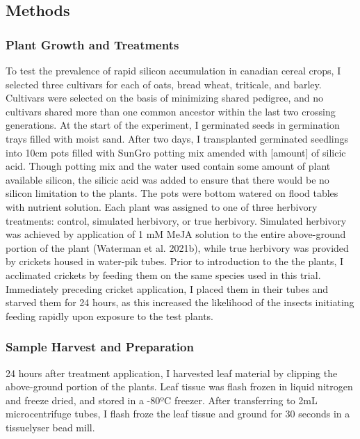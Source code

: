 \documentclass[12pt, letterpaper, ]{article}
\begin{document}
\subsection{Methods}

\subsubsection{Plant Growth and Treatments}

To test the prevalence of rapid silicon accumulation in canadian cereal crops, I selected three cultivars for each of oats, bread wheat, triticale, and barley. Cultivars were selected on the basis of minimizing shared pedigree, and no cultivars shared more than one common ancestor within the last two crossing generations. At the start of the experiment, I germinated seeds in germination trays filled with moist sand. After two days, I transplanted germinated seedlings into 10cm pots filled with SunGro potting mix amended with [amount] of silicic acid. Though potting mix and the water used contain some amount of plant available silicon, the silicic acid was added to ensure that there would be no silicon limitation to the plants. The pots were bottom watered on flood tables with nutrient solution. Each plant was assigned to one of three herbivory treatments: control, simulated herbivory, or true herbivory. Simulated herbivory was achieved by application of 1 mM MeJA solution to the entire above-ground portion of the plant (Waterman et al. 2021b), while true herbivory was provided by crickets housed in water-pik tubes. Prior to introduction to the the plants, I acclimated crickets by feeding them on the same species used in this trial. Immediately preceding cricket application, I placed them in their tubes and starved them for 24 hours, as this increased the likelihood of the insects initiating feeding rapidly upon exposure to the test plants. 

\subsubsection{Sample Harvest and Preparation}

24 hours after treatment application, I harvested leaf material by clipping the above-ground portion of the plants. Leaf tissue was flash frozen in liquid nitrogen and freeze dried, and stored in a -80ºC freezer. After transferring to 2mL microcentrifuge tubes, I flash froze the leaf tissue and ground for 30 seconds in a tissuelyser bead mill. 
\end{document}
